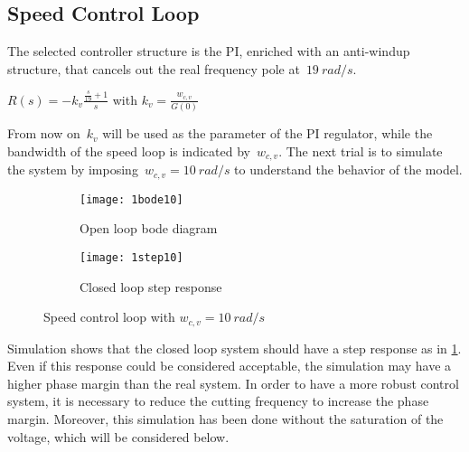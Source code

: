 \newpage
\subsection{Speed Control Loop}
The selected controller structure is the PI, enriched with an anti-windup structure, that cancels out the real frequency pole at~$19\ rad/s$.
\begin{center}
$ R(s) = -k_v \frac{\frac{s}{19}+1}{s} $
with
$ k_{v} = \frac{w_{c,v}}{G(0)} $
\end{center}
From now on~$k_v$ will be used as the parameter of the PI regulator, while the bandwidth of the speed loop is indicated by~$w_{c,v}$. The next trial is to simulate the system by imposing~$w_{c,v} = 10\ rad/s$ to understand the behavior of the model.
\\
\begin{figure*}[h]
	\centering
	\begin{subfigure}{0.47\columnwidth}
		\texttt{[image: 1bode10]}
		\caption{Open loop bode diagram}
	\end{subfigure}
	\begin{subfigure}{0.47\columnwidth}
		\texttt{[image: 1step10]}
		\caption{Closed loop step response}
		\label{fig:step_PI1dof}
	\end{subfigure}
	\caption{Speed control loop with $w_{c,v} = 10\ rad/s$}
	\label{fig:Bode and Step PI 10}
\end{figure*}

Simulation shows that the closed loop system should have a step response as in \cref{fig:step_PI1dof}. 
Even if this response could be considered acceptable, the simulation may have a higher phase margin than the real system. In order to have a more robust control system, it is necessary to reduce the cutting frequency to increase the phase margin. Moreover, this simulation has been done without the saturation of the voltage, which will be considered below.

